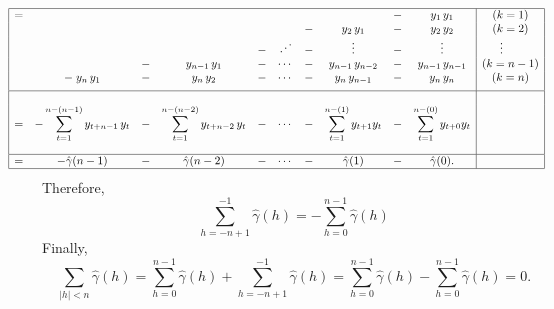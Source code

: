 \[\everymath{\displaystyle} \hspace{-3em}
\begin{array}{|rccccccccc|c|}
    \hline
    = & & & & & & & & - & y_1\, y_1 &  (k = 1)\\
     & & & & & & - & y_2\, y_1 & - & y_{2}\, y_2 &  (k = 2) \\
     & & & & - & \iddots & - & \vdots & - & \vdots & \hfill \vdots \hfill \hfill \\
     & & - & y_{n-1}\, y_1 & - & \cdots & - & y_{n-1}\, y_{n-2} & - & y_{n-1}\, y_{n-1} & (k = n-1)\\
     & - \; y_{n}\, y_1 & - & y_{n}\, y_2 & - & \cdots & - & y_{n}\, y_{n-1} & - & y_{n}\, y_{n} & (k = n)\\[0.5em]
     \hline &&&&&&&&&&\\
    = & - \sum_{t = 1}^{n-(n-1)} y_{t+n-1}\, y_{t} & - & \sum_{t = 1}^{n-(n-2)} y_{t+n-2}\, y_{t} & - & \cdots & - & \sum_{t = 1}^{n-(1)} y_{t+1} y_{t} & - & \sum_{t = 1}^{n-(0)} y_{t+0} y_{t} &\\[2em]
    \hline
     = & - \hat{\gamma}(n-1) & - & \hat{\gamma}(n-2) & - & \cdots & - & \hat{\gamma}(1) & - & \hat{\gamma}(0). &\\
     \hline
\end{array} \]
Therefore,
\[ \sum_{h = -n+1}^{-1} \hat{\gamma} (h) = - \sum_{h = 0}^{n-1}\hat{\gamma}(h) \]
Finally,
\[ \sum_{|h|<n} \hat{\gamma}(h) = \sum_{h = 0}^{n-1} \hat{\gamma}(h)+  \sum_{h = -n+1}^{-1} \hat{\gamma} (h) = \sum_{h = 0}^{n-1} \hat{\gamma}(h) - \sum_{h = 0}^{n-1} \hat{\gamma}(h) = 0. \]
